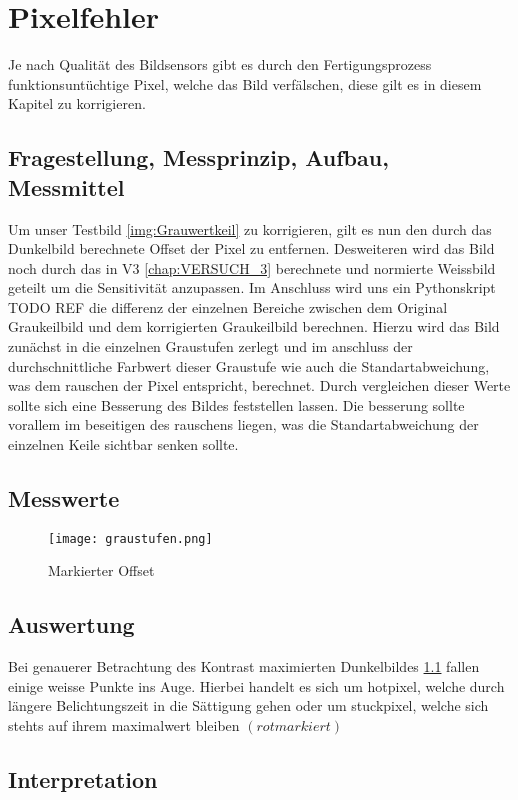 %
%
\chapter{Pixelfehler}
Je nach Qualität des Bildsensors gibt es durch den Fertigungsprozess funktionsuntüchtige Pixel, welche das Bild verfälschen, diese gilt es in diesem Kapitel zu korrigieren.
\label{chap:Pixelfehler}

\section{Fragestellung, Messprinzip, Aufbau, Messmittel}
Um unser Testbild \ref{img:Grauwertkeil} zu korrigieren, gilt es nun den durch das Dunkelbild berechnete Offset der Pixel zu entfernen. Desweiteren wird das Bild noch durch das in V3 \ref{chap:VERSUCH_3} berechnete und normierte Weissbild geteilt um die Sensitivität anzupassen.
Im Anschluss wird uns ein Pythonskript TODO REF die differenz der einzelnen Bereiche zwischen dem Original Graukeilbild und dem korrigierten Graukeilbild berechnen. Hierzu wird das Bild zunächst in die einzelnen Graustufen zerlegt und im anschluss der durchschnittliche Farbwert dieser Graustufe wie auch die Standartabweichung, was dem rauschen der Pixel entspricht, berechnet. Durch vergleichen dieser Werte sollte sich eine Besserung des Bildes feststellen lassen. Die besserung sollte vorallem im beseitigen des rauschens liegen, was die Standartabweichung der einzelnen Keile sichtbar senken sollte.
\label{chap:VERSUCH_4_FRAGESTELLUNG}

\section{Messwerte}
\begin{figure}[H]
\centering
\texttt{[image: graustufen.png]}
\caption{Markierter Offset}
\label{img:struckpixel.png}
\end{figure}
\label{chap:VERSUCH_4_MESSWERTE}

\section{Auswertung}
Bei genauerer Betrachtung des Kontrast maximierten Dunkelbildes \ref{img:struckpixel.png} fallen einige weisse Punkte ins Auge. Hierbei handelt es sich um hotpixel, welche durch längere Belichtungszeit in die Sättigung gehen oder um stuckpixel, welche sich stehts auf ihrem maximalwert bleiben $(rot markiert)$
\label{chap:VERSUCH_4_AUSWERTUNG}

\section{Interpretation}
\label{chap:VERSUCH_4_INTERPRETATION}